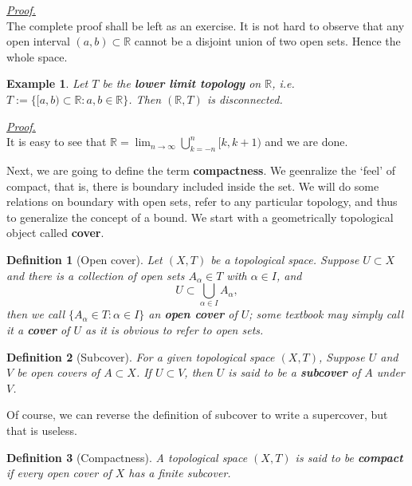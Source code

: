 \documentclass[12pt]{article}
\newtheorem{definition}{Definition}[section]
\newtheorem*{example}{Example}
\renewenvironment{proof}[1][Proof]{\begin{snugshade*} \underline{\textit{{#1}.}}\\}{\hfill \qedsymbol \end{snugshade*}}
\begin{document}
    \begin{proof}
        The complete proof shall be left as an exercise. It is not hard to observe that any open interval $(a,b)\subset \mathbb{R}$ cannot be a disjoint union of two open sets. Hence the whole space.
    \end{proof}

    \begin{example}
        Let $T$ be the \textbf{lower limit topology} on $\mathbb{R}$, i.e. $T:=\{[a,b)\subset \mathbb{R}: a,b\in\mathbb{R}\}$. Then $(\mathbb{R},T)$ is disconnected.
    \end{example}

    \begin{proof}
        It is easy to see that $\mathbb{R}=\displaystyle \lim_{n\to \infty}\bigcup_{k=-n}^n [k,k+1)$ and we are done.
    \end{proof}

    Next, we are going to define the term \textbf{compactness}. We geenralize the `feel' of compact, that is, there is boundary included inside the set. We will do some relations on boundary with open sets, refer to any particular topology, and thus to generalize the concept of a bound. We start with a geometrically topological object called \textbf{cover}.

    \begin{definition}[Open cover]
        Let $(X,T)$ be a topological space. Suppose $U\subset X$ and there is a collection of open sets $A_\alpha \in T$ with $\alpha\in I$, and \[U\subset \bigcup_{\alpha\in I}A_\alpha,\] then we call $\{A_\alpha\in T: \alpha\in I\}$ an \textbf{open cover} of $U$; some textbook may simply call it a \textbf{cover} of $U$ as it is obvious to refer to open sets.
    \end{definition}

    \begin{definition}[Subcover]
        For a given topological space $(X,T)$, Suppose $U$ and $V$ be open covers of $A\subset X$. If $U\subset V$, then $U$ is said to be a \textbf{subcover} of $A$ under $V$.
    \end{definition}

    Of course, we can reverse the definition of subcover to write a supercover, but that is useless.

    \begin{definition}[Compactness]
        A topological space $(X,T)$ is said to be \textbf{compact} if every open cover of $X$ has a finite subcover.
    \end{definition}
\end{document}
